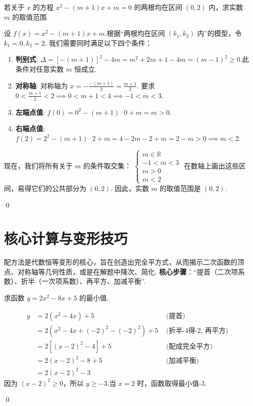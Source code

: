	\begin{exercise}
		若关于 $x$ 的方程 $x^2 - (m+1)x + m = 0$ 的两根均在区间 $(0, 2)$ 内，求实数 $m$ 的取值范围.
	\end{exercise}
	\begin{solution}
		设 $f(x) = x^2 - (m+1)x + m$.根据“两根均在区间 $(k_1, k_2)$ 内”的模型，令 $k_1=0, k_2=2$.
		我们需要同时满足以下四个条件：
		\begin{enumerate}
			\item \textbf{判别式}: $\Delta = [-(m+1)]^2 - 4m = m^2+2m+1-4m = (m-1)^2 \ge 0$.此条件对任意实数 $m$ 恒成立.
			\item \textbf{对称轴}: 对称轴为 $x = -\frac{-(m+1)}{2} = \frac{m+1}{2}$.
			要求 $0 < \frac{m+1}{2} < 2 \implies 0 < m+1 < 4 \implies -1 < m < 3$.
			\item \textbf{左端点值}: $f(0) = 0^2 - (m+1)\cdot 0 + m = m > 0$.
			\item \textbf{右端点值}: $f(2) = 2^2 - (m+1)\cdot 2 + m = 4 - 2m - 2 + m = 2-m > 0 \implies m < 2$.
		\end{enumerate}
		现在，我们将所有关于 $m$ 的条件取交集：
		$\begin{cases} m \in \mathbb{R} \\ -1 < m < 3 \\ m > 0 \\ m < 2 \end{cases}$
		在数轴上画出这些区间，易得它们的公共部分为 $(0, 2)$.
		因此，实数 $m$ 的取值范围是 $(0, 2)$.
	\end{solution}
	\qed
	
	\section{核心计算与变形技巧}
	
	\begin{definition}[配方法]
		配方法是代数恒等变形的核心，旨在创造出完全平方式，从而揭示二次函数的顶点、对称轴等几何性质，或是在解题中降次、简化.
		\textbf{核心步骤}：“提首（二次项系数）、折半（一次项系数）、再平方、加减平衡”.
		\begin{exercise}
			求函数 $y=2x^2-8x+5$ 的最小值.
		\end{exercise}
		\begin{solution}
			\begin{align*}
				y &= 2(x^2-4x) + 5 & \text{ (提首)} \\
				&= 2(x^2 - 4x + (-2)^2 - (-2)^2) + 5 & \text{ (折半-4得-2, 再平方)} \\
				&= 2[(x-2)^2 - 4] + 5 & \text{ (配成完全平方)} \\
				&= 2(x-2)^2 - 8 + 5 & \text{ (加减平衡)} \\
				&= 2(x-2)^2 - 3
			\end{align*}
			因为 $(x-2)^2 \ge 0$，所以 $y \ge -3$.当 $x=2$ 时，函数取得最小值-3.
		\end{solution}
		\qed
	\end{definition}
	
